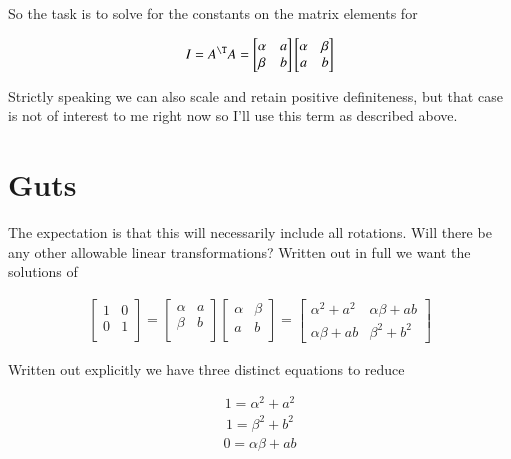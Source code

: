 So the task is to solve for the constants on the matrix elements for

\begin{align}\label{eqn:quadratricForm:voo4}
I = A^\T A = 
\begin{bmatrix}
\alpha & a     \\
\beta  & b \\
\end{bmatrix}
\begin{bmatrix}
\alpha & \beta \\
a      & b \\
\end{bmatrix}
\end{align}

Strictly speaking we can also scale and retain positive definiteness, but that case is not of interest to me right now so I'll use this term as described above.

\section{Guts}

The expectation is that this will necessarily include all rotations.  Will there be any other allowable linear transformations?  Written out in full we want the solutions of 

\begin{align}\label{eqn:quadratricForm:voo5a}
\begin{bmatrix}
1 & 0 \\
0 & 1 \\
\end{bmatrix}
=
\begin{bmatrix}
\alpha & a     \\
\beta  & b \\
\end{bmatrix}
\begin{bmatrix}
\alpha & \beta \\
a      & b \\
\end{bmatrix}
= 
\begin{bmatrix}
\alpha^2 + a^2 & \alpha \beta + a b \\
\alpha \beta + a b & \beta^2 + b^2
\end{bmatrix}
\end{align}

Written out explicitly we have three distinct equations to reduce

\begin{align}\label{eqn:quadratricForm:voo5}
1 = \alpha^2 + a^2 
\end{align}
\begin{align}\label{eqn:quadratricForm:voo6}
1 = \beta^2 + b^2 
\end{align}
\begin{align}\label{eqn:quadratricForm:voo7}
0 = \alpha \beta + a b 
\end{align}

